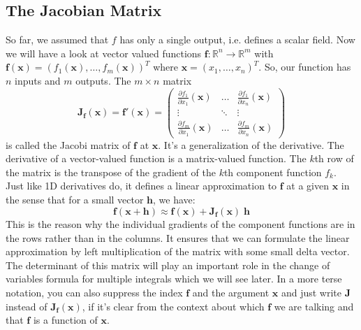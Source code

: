 \subsection{The Jacobian Matrix}
So far, we assumed that $f$ has only a single output, i.e. defines a scalar field. Now we will have a look at vector valued functions $\mathbf{f}: \mathbb{R}^n \rightarrow \mathbb{R}^m$ with $\mathbf{f(x)} = (f_1(\mathbf{x}), \ldots, f_m(\mathbf{x}))^T$ where $\mathbf{x} = (x_1,\ldots,x_n)^T$. So, our function has $n$ inputs and $m$ outputs. The $m \times n$ matrix
\begin{equation}
 \mathbf{J_f}(\mathbf{x}) = 
 \mathbf{f'}(\mathbf{x}) = 
 \begin{pmatrix}
  \frac{\partial f_1}{\partial x_1} (\mathbf{x}) & \hdots & \frac{\partial f_1}{\partial x_n} (\mathbf{x}) \\
  \vdots & \ddots & \vdots \\
  \frac{\partial f_m}{\partial x_1} (\mathbf{x}) & \hdots & \frac{\partial f_m}{\partial x_n} (\mathbf{x})
 \end{pmatrix}
\end{equation}	
is called the Jacobi matrix	of $\mathbf{f}$ at $\mathbf{x}$. It's a generalization of the derivative. The derivative of a vector-valued function is a matrix-valued function. The $k$th row of the matrix is the transpose of the gradient of the $k$th component function $f_k$. Just like 1D derivatives do, it defines a linear approximation to $\mathbf{f}$ at a given $\mathbf{x}$ in the sense that for a small vector  $\mathbf{h}$, we have:
\begin{equation}
 \mathbf{f}(\mathbf{x + h}) \approx 
 \mathbf{f}(\mathbf{x}) + \mathbf{J_f(x) \; h}
\end{equation}	
This is the reason why the individual gradients of the component functions are in the rows rather than in the columns. It ensures that we can formulate the linear approximation by left multiplication of the matrix with some small delta vector. The determinant of this matrix will play an important role in the change of variables formula for multiple integrals which we will see later. In a more terse notation, you can also suppress the index $\mathbf{f}$ and the argument $\mathbf{x}$ and just write $\mathbf{J}$ instead of $\mathbf{J_f}(\mathbf{x})$, if it's clear from the context about which $\mathbf{f}$ we are talking and that $\mathbf{f}$ is a function of $\mathbf{x}$.


